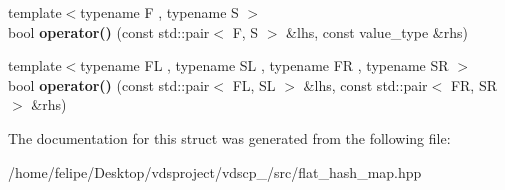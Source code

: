 \begin{DoxyCompactItemize}
\item 
{\footnotesize template$<$typename F , typename S $>$ }\\bool {\bfseries operator()} (const std\+::pair$<$ F, S $>$ \&lhs, const value\+\_\+type \&rhs)\label{structska_1_1detailv3_1_1KeyOrValueEquality_aa7884496aa9d2e7d4dcdb96afc48a4ff}

\item 
{\footnotesize template$<$typename FL , typename SL , typename FR , typename SR $>$ }\\bool {\bfseries operator()} (const std\+::pair$<$ FL, SL $>$ \&lhs, const std\+::pair$<$ FR, SR $>$ \&rhs)\label{structska_1_1detailv3_1_1KeyOrValueEquality_a44362fa34b55c87e3f4e9b0d2906770b}

\end{DoxyCompactItemize}


The documentation for this struct was generated from the following file\+:\begin{DoxyCompactItemize}
\item 
/home/felipe/\+Desktop/vdsproject/vdscp\+\_/src/flat\+\_\+hash\+\_\+map.\+hpp\end{DoxyCompactItemize}
